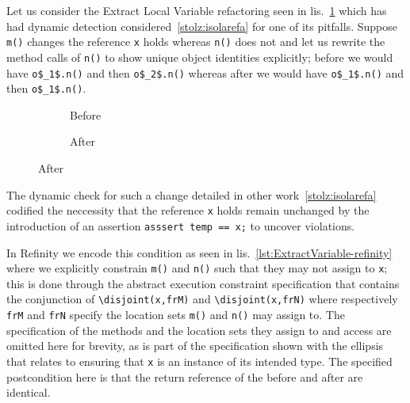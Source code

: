Let us consider the Extract Local Variable refactoring seen in lis.~\ref{lst:ExtractVariable-java} which has had dynamic detection
considered~\ref{stolz:isolarefa} for one of its pitfalls. Suppose \lstinline[style=smallJava]|m()| changes the reference
\lstinline[style=smallJava]|x| holds whereas \lstinline[style=smallJava]|n()| does not and let us rewrite the method calls of \lstinline[style=smallJava]|n()| to show unique
object identities explicitly; before we would have \lstinline[mathescape=true,style=smallJava]|o$_1$.n()| and then
\lstinline[mathescape=true,style=smallJava]|o$_2$.n()| whereas after we would have \lstinline[mathescape=true,style=smallJava]|o$_1$.n()|
and then \lstinline[mathescape=true,style=smallJava]|o$_1$.n()|.


\begin{figure}[!htb]
  \centering
  \begin{subfigure}{.2\linewidth}
    
    \caption{Before}
  \end{subfigure}\hspace{1cm}
  \begin{subfigure}{.3\linewidth}
    
    \caption{After}
  \end{subfigure}
\label{lst:ExtractVariable-java}
\end{figure}

The dynamic check for such a change detailed in other work~\ref{stolz:isolarefa} codified the neccessity that the reference \lstinline[style=smallJava]|x|
holds remain unchanged by the introduction of an assertion \lstinline[style=smallJava]|asssert temp == x;| to uncover violations.

In Refinity we encode this condition as seen in lis.~\ref{lst:ExtractVariable-refinity} where we explicitly constrain \lstinline[style=refinity]|m()| and
\lstinline[style=refinity]|n()| such that they may not assign to \lstinline[style=refinity]|x|; this is done through the abstract execution constraint
specification that contains the conjunction of \lstinline[style=refinity]|\disjoint(x,frM)| and \lstinline[style=refinity]|\disjoint(x,frN)| where respectively
\lstinline[style=refinity]|frM| and \lstinline[style=refinity]|frN| specify the location sets \lstinline[style=refinity]|m()| and \lstinline[style=refinity]|n()| may
assign to. The specification of the methods and the location sets they assign to and access are omitted here for brevity, as is part of the specification shown
with the ellipsis that relates to ensuring that \lstinline[style=refinity]|x| is an instance of its intended type. The specified postcondition here is that the
return reference of the before and after are identical.



